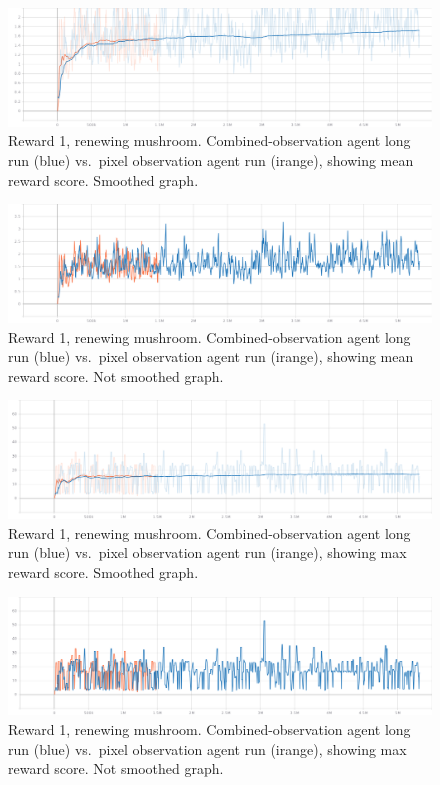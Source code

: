 \documentclass[]{article}
\begin{document}
\begin{figure}
\centering
\includegraphics{./img/114085622-e4314680-98b1-11eb-9c94-fee1d1136a3b.png}
\caption{Reward 1, renewing mushroom. Combined-observation agent long
run (blue) vs.~pixel observation agent run (irange), showing mean reward
score. Smoothed graph.}
\end{figure}

\begin{figure}
\centering
\includegraphics{./img/114085753-104cc780-98b2-11eb-837d-6426436cc838.png}
\caption{Reward 1, renewing mushroom. Combined-observation agent long
run (blue) vs.~pixel observation agent run (irange), showing mean reward
score. Not smoothed graph.}
\end{figure}

\begin{figure}
\centering
\includegraphics{./img/114086014-67529c80-98b2-11eb-82e1-34d404e5a999.png}
\caption{Reward 1, renewing mushroom. Combined-observation agent long
run (blue) vs.~pixel observation agent run (irange), showing max reward
score. Smoothed graph.}
\end{figure}

\begin{figure}
\centering
\includegraphics{./img/114086048-6faad780-98b2-11eb-8c0e-764396b1fc3b.png}
\caption{Reward 1, renewing mushroom. Combined-observation agent long
run (blue) vs.~pixel observation agent run (irange), showing max reward
score. Not smoothed graph.}
\end{figure}
\end{document}
